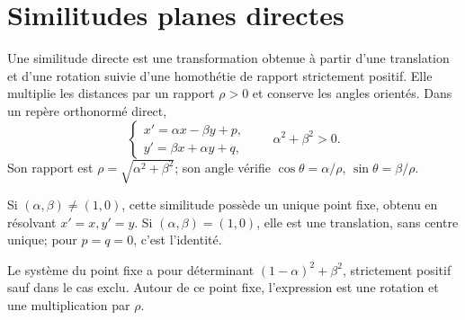 \section{Similitudes planes directes}
\begin{definition}Une similitude directe est une transformation obtenue à partir d’une translation et d’une rotation suivie d’une homothétie de rapport strictement positif. Elle multiplie les distances par un rapport $\rho>0$ et conserve les angles orientés. Dans un repère orthonormé direct,
\[
\begin{cases}x'=\alpha x-\beta y+p,\\y'=\beta x+\alpha y+q,\end{cases}
\qquad \alpha^2+\beta^2>0.
\]
Son rapport est $\rho=\sqrt{\alpha^2+\beta^2}$; son angle vérifie $\cos\theta=\alpha/\rho$, $\sin\theta=\beta/\rho$.
\end{definition}
\begin{propriete}Si $(\alpha,\beta)\ne(1,0)$, cette similitude possède un unique point fixe, obtenu en résolvant $x'=x,y'=y$. Si $(\alpha,\beta)=(1,0)$, elle est une translation, sans centre unique; pour $p=q=0$, c’est l’identité.\end{propriete}
\begin{demonstration}Le système du point fixe a pour déterminant $(1-\alpha)^2+\beta^2$, strictement positif sauf dans le cas exclu. Autour de ce point fixe, l’expression est une rotation et une multiplication par $\rho$.\end{demonstration}


